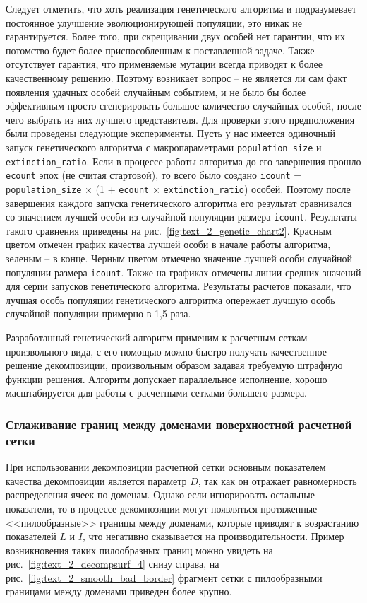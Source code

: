 Следует отметить, что хоть реализация генетического алгоритма и подразумевает постоянное улучшение эволюционирующей популяции, это никак не гарантируется.
Более того, при скрещивании двух особей нет гарантии, что их потомство будет более приспособленным к поставленной задаче.
Также отсутствует гарантия, что применяемые мутации всегда приводят к более качественному решению.
Поэтому возникает вопрос -- не является ли сам факт появления удачных особей случайным событием, и не было бы более эффективным просто сгенерировать большое количество случайных особей, после чего выбрать из них лучшего представителя.
Для проверки этого предположения были проведены следующие эксперименты.
Пусть у нас имеется одиночный запуск генетического алгоритма с макропараметрами \texttt{population\_size} и \texttt{extinction\_ratio}.
Если в процессе работы алгоритма до его завершения прошло \texttt{ecount} эпох (не считая стартовой), то всего было создано \texttt{icount} = \texttt{population\_size} × (1 + \texttt{ecount} × \texttt{extinction\_ratio}) особей.
Поэтому после завершения каждого запуска генетического алгоритма его результат сравнивался со значением лучшей особи из случайной популяции размера \texttt{icount}.
Результаты такого сравнения приведены на рис.~\ref{fig:text_2_genetic_chart2}.
Красным цветом отмечен график качества лучшей особи в начале работы алгоритма, зеленым -- в конце.
Черным цветом отмечено значение лучшей особи случайной популяции размера \texttt{icount}.
Также на графиках отмечены линии средних значений для серии запусков генетического алгоритма.
Результаты расчетов показали, что лучшая особь популяции генетического алгоритма опережает лучшую особь случайной популяции примерно в 1,5 раза.

Разработанный генетический алгоритм применим к расчетным сеткам произвольного вида, с его помощью можно быстро получать качественное решение декомпозиции, произвольным образом задавая требуемую штрафную функции решения.
Алгоритм допускает параллельное исполнение, хорошо масштабируется для работы с расчетными сетками большего размера.

\subsubsection{Сглаживание границ между доменами поверхностной \mbox{расчетной} сетки}\label{sec:text_2_smooth}

При использовании декомпозиции расчетной сетки основным показателем качества декомпозиции является параметр $D$, так как он отражает равномерность распределения ячеек по доменам.
Однако если игнорировать остальные показатели, то в процессе декомпозиции могут появляться протяженные <<пилообразные>> границы между доменами, которые приводят к возрастанию показателей $L$ и $I$, что негативно сказывается на производительности.
Пример возникновения таких пилообразных границ можно увидеть на рис.~\ref{fig:text_2_decompsurf_4} снизу справа, на рис.~\ref{fig:text_2_smooth_bad_border} фрагмент сетки с пилообразными границами между доменами приведен более крупно.


